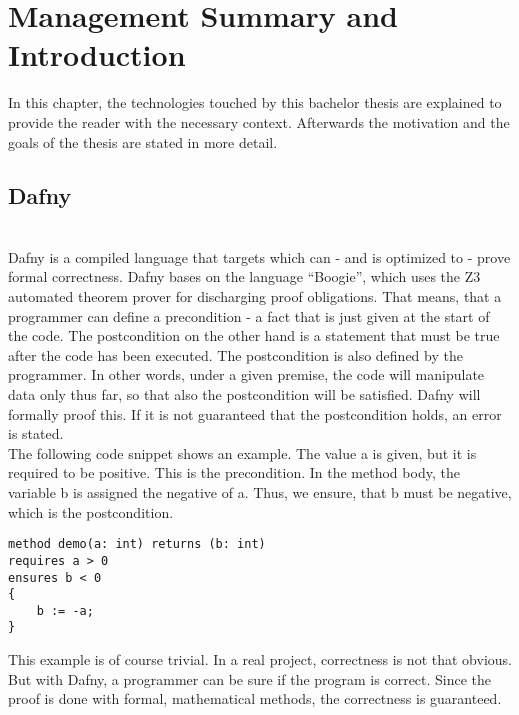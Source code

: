 \section{Management Summary and Introduction}
\label{section:introduction}
In this chapter, the technologies touched by this bachelor thesis are explained to provide the reader with the necessary context. Afterwards the motivation and the goals of the thesis are stated in more detail.

\subsection{Dafny}
\label{section:introduction:dafny}
 \\
Dafny is a compiled language that targets \Csharp which can - and is optimized to - prove formal correctness.\cite{dafnyWiki} Dafny bases on the language “Boogie”, which uses the Z3 automated theorem prover for discharging proof obligations.\cite{dafnyWiki} That means, that a programmer can define a precondition - a fact that is just given at the start of the code. The postcondition on the other hand is a statement that must be true after the code has been executed. The postcondition is also defined by the programmer. In other words, under a given premise, the code will manipulate data only thus far, so that also the postcondition will be satisfied. Dafny will formally proof this. If it is not guaranteed that the postcondition holds, an error is stated.\\

The following code snippet shows an example. The value a is given, but it is required to be positive. This is the precondition. In the method body, the variable b is assigned the negative of a. Thus, we ensure, that b must be negative, which is the postcondition.
\begin{lstlisting}[language=dafny, caption={Simple Dafny Example}, captionpos=b, label={lst:simpleDafnyExample}]
method demo(a: int) returns (b: int)
requires a > 0
ensures b < 0
{
    b := -a;
}
\end{lstlisting}
This example is of course trivial. In a real project, correctness is not that obvious. But with Dafny, a programmer can be sure if the program is correct. Since the proof is done with formal, mathematical methods, the correctness is guaranteed.\\

